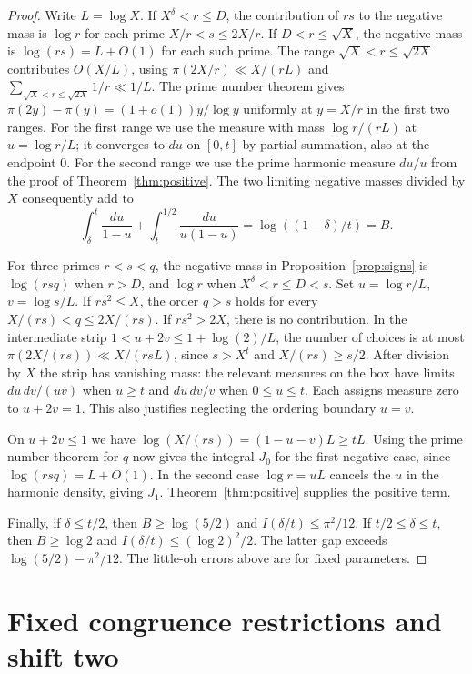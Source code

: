 \documentclass[11pt]{article}
\begin{document}
\begin{proof}
Write \(L=\log X\). If \(X^\delta<r\le D\), the contribution of \(rs\)
to the negative mass is \(\log r\) for each prime
\(X/r<s\le 2X/r\). If \(D<r\le\sqrt X\), the negative mass is
\(\log(rs)=L+O(1)\) for each such prime. The range
\(\sqrt X<r\le\sqrt{2X}\) contributes \(O(X/L)\), using
\(\pi(2X/r)\ll X/(rL)\) and
\(\sum_{\sqrt X<r\le\sqrt{2X}}1/r\ll 1/L\).
The prime number theorem gives
\(\pi(2y)-\pi(y)=(1+o(1))y/\log y\) uniformly at \(y=X/r\) in
the first two ranges. For the first range we use the measure with
mass \(\log r/(rL)\) at \(u=\log r/L\); it converges to \(du\) on
\([0,t]\) by partial summation, also at the endpoint \(0\).
For the second range we use the prime harmonic measure \(du/u\)
from the proof of Theorem~\ref{thm:positive}. The two limiting negative
masses divided by \(X\) consequently add to
\[
  \int_\delta^t\frac{du}{1-u}+
  \int_t^{1/2}\frac{du}{u(1-u)}=\log((1-\delta)/t)=B .
\]

For three primes \(r<s<q\), the negative mass in
Proposition~\ref{prop:signs} is \(\log(rsq)\) when \(r>D\), and
\(\log r\) when \(X^\delta<r\le D<s\). Set \(u=\log r/L\),
\(v=\log s/L\). If \(rs^2\le X\), the order \(q>s\) holds for
every \(X/(rs)<q\le 2X/(rs)\). If \(rs^2>2X\), there is no
contribution. In the intermediate strip
\(1<u+2v\le 1+\log(2)/L\), the number of choices is at most
\(\pi(2X/(rs))\ll X/(rsL)\), since \(s>X^t\) and
\(X/(rs)\ge s/2\).
After division by \(X\) the strip has vanishing mass: the relevant
measures on the box have limits \(du\,dv/(uv)\) when \(u\ge t\)
and \(du\,dv/v\) when \(0\le u\le t\). Each assigns measure zero
to \(u+2v=1\). This also justifies neglecting the ordering boundary
\(u=v\).

On \(u+2v\le1\) we have \(\log(X/(rs))=(1-u-v)L\ge tL\).
Using the prime number theorem for \(q\) now gives the integral
\(J_0\) for the first negative case, since \(\log(rsq)=L+O(1)\).
In the second case \(\log r=uL\) cancels the \(u\) in the harmonic
density, giving \(J_1\). Theorem~\ref{thm:positive} supplies the
positive term.

Finally, if \(\delta\le t/2\), then \(B\ge\log(5/2)\) and
\(I(\delta/t)\le\pi^2/12\). If \(t/2\le\delta\le t\), then
\(B\ge\log 2\) and \(I(\delta/t)\le(\log 2)^2/2\). The latter
gap exceeds \(\log(5/2)-\pi^2/12\). The little-oh errors above
are for fixed parameters.
\end{proof}

\section{Fixed congruence restrictions and shift two}
\end{document}
